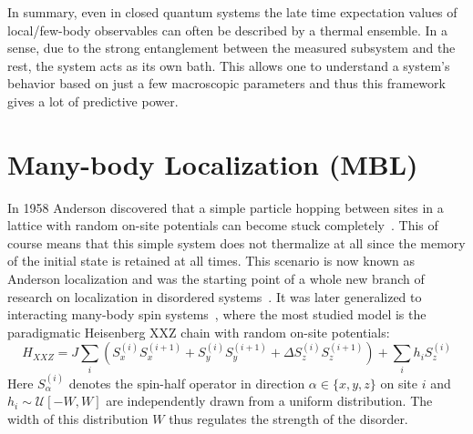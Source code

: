 
In summary, even in closed quantum systems the late time expectation values of local/few-body observables can often be described by a thermal ensemble. In a sense, due to the strong entanglement between the measured subsystem and the rest, the system acts as its own bath. This allows one to understand a system's behavior based on just a few macroscopic parameters and thus this framework gives a lot of predictive power.


%
%

\section{Many-body Localization (MBL)}
\label{sec:MBL}
In 1958 Anderson discovered that a simple particle hopping between sites in a lattice with random on-site potentials can become stuck completely~\cite{andersonAbsenceDiffusionCertain1958}. This of course means that this simple system does not thermalize at all since the memory of the initial state is retained at all times. This scenario is now known as Anderson localization and was the starting point of a whole new branch of research on localization in disordered systems~\cite{imbrieReviewLocalIntegrals2017,abaninRecentProgressManybody2017,parameswaranEigenstatePhaseTransitions2017,abaninManybodyLocalizationThermalization2019,laflorencieEntanglementEntropyLocalization2022,sierantManyBodyLocalizationAge2024}.
It was later generalized to interacting many-body spin systems~\cite{fleishmanInteractionsAndersonTransition1980,baskoMetalinsulatorTransitionWeakly2006,gornyiInteractingElectronsDisordered2005}, where the most studied model is the paradigmatic Heisenberg XXZ chain with random on-site potentials:
\begin{equation}\label{eq:XXZ-onsite}
	H_{XXZ} = J \sum_i \left(S_x^{(i)}S_x^{(i+1)} + S_y^{(i)}S_y^{(i+1)} + \Delta S_z^{(i)}S_z^{(i+1)}\right) + \sum_i h_i S_z^{(i)}
\end{equation}
Here $S_\alpha^{(i)}$ denotes the spin-half operator in direction $\alpha\in\{x,y,z\}$ on site $i$ and $h_i \sim \mathcal{U}[-W,W]$ are independently drawn from a uniform distribution. The width of this distribution $W$ thus regulates the strength of the disorder.

